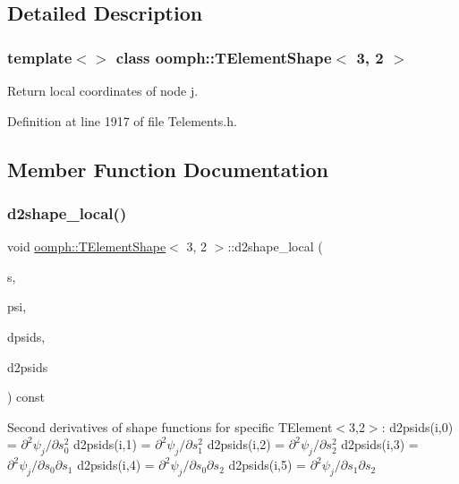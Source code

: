 \subsection{Detailed Description}
\subsubsection*{template$<$$>$\newline
class oomph\+::\+T\+Element\+Shape$<$ 3, 2 $>$}

Return local coordinates of node j. 

Definition at line 1917 of file Telements.\+h.



\subsection{Member Function Documentation}
\mbox{\label{classoomph_1_1TElementShape_3_013_00_012_01_4_ae89c2c44ccb5033bc958080a9693a972}} 
\subsubsection{\texorpdfstring{d2shape\+\_\+local()}{d2shape\_local()}}
{\footnotesize\ttfamily void \hyperlink{classoomph_1_1TElementShape}{oomph\+::\+T\+Element\+Shape}$<$ 3, 2 $>$\+::d2shape\+\_\+local (\begin{DoxyParamCaption}\item[{const \hyperlink{classoomph_1_1Vector}{Vector}$<$ double $>$ \&}]{s,  }\item[{\hyperlink{classoomph_1_1Shape}{Shape} \&}]{psi,  }\item[{\hyperlink{classoomph_1_1DShape}{D\+Shape} \&}]{dpsids,  }\item[{\hyperlink{classoomph_1_1DShape}{D\+Shape} \&}]{d2psids }\end{DoxyParamCaption}) const\hspace{0.3cm}{\ttfamily [inline]}}

Second derivatives of shape functions for specific T\+Element$<$3,2$>$\+: d2psids(i,0) = $ \partial^2 \psi_j / \partial s_0^2 $ d2psids(i,1) = $ \partial^2 \psi_j / \partial s_1^2 $ d2psids(i,2) = $ \partial^2 \psi_j / \partial s_2^2 $ d2psids(i,3) = $ \partial^2 \psi_j / \partial s_0 \partial s_1 $ d2psids(i,4) = $ \partial^2 \psi_j / \partial s_0 \partial s_2 $ d2psids(i,5) = $ \partial^2 \psi_j / \partial s_1 \partial s_2 $ 

